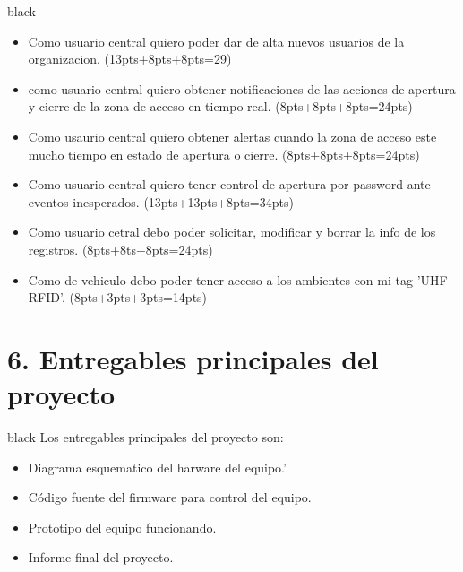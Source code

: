 \documentclass[
11pt, %
codirector, %
]{charter}
\begin{document}
\begin{consigna}{black}
\begin{itemize}
\begin{itemize}
	\item Como usuario central quiero poder dar de alta nuevos usuarios de la organizacion.
	 (13pts+8pts+8pts=29)
	\item como usuario central quiero obtener notificaciones de las acciones de apertura y cierre de la zona de acceso en tiempo real. (8pts+8pts+8pts=24pts)
	\item Como usaurio central quiero obtener alertas cuando la zona de acceso este mucho tiempo en estado de apertura o cierre. (8pts+8pts+8pts=24pts)
	\item Como usuario central quiero tener control de apertura por password ante eventos inesperados. (13pts+13pts+8pts=34pts)
	\item Como usuario cetral debo poder solicitar, modificar y borrar  la info de los registros. (8pts+8ts+8pts=24pts)
	\item Como de vehiculo debo poder tener acceso a los ambientes con mi tag 'UHF RFID'. 
	(8pts+3pts+3pts=14pts)
\end{itemize}
\end{itemize}
\end{consigna}
\section{6. Entregables principales del proyecto}
\label{sec:entregables}
\begin{consigna}{black}
Los entregables principales del proyecto son:
\begin{itemize}
	\item Diagrama esquematico del harware del equipo.'
	\item Código fuente del firmware para control del equipo.
	\item Prototipo del equipo funcionando.
	\item Informe final del proyecto.
\end{itemize}
\end{consigna}
\end{document}
